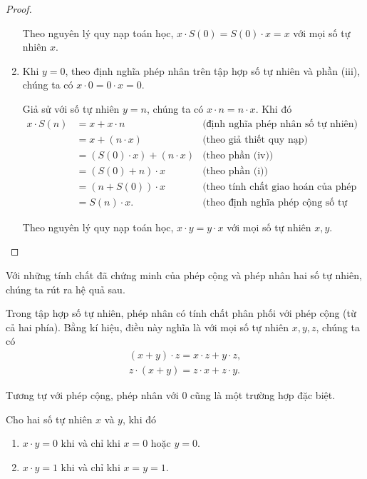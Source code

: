 \begin{proof}
\begin{enumerate}[label={(\roman*)}]
              Theo nguyên lý quy nạp toán học, $x\cdot S(0) = S(0)\cdot x = x$ với mọi số tự nhiên $x$.
        \item Khi $y = 0$, theo định nghĩa phép nhân trên tập hợp số tự nhiên và phần (iii), chúng ta có $x\cdot 0 = 0\cdot x = 0$.

              Giả sử với số tự nhiên $y = n$, chúng ta có $x\cdot n = n\cdot x$. Khi đó
              \begin{align*}
                  x\cdot S(n) & = x + x\cdot n               & \text{(định nghĩa phép nhân số tự nhiên)}                   \\
                              & = x + (n\cdot x)             & \text{(theo giả thiết quy nạp)}                             \\
                              & = (S(0)\cdot x) + (n\cdot x) & \text{(theo phần (iv))}                                     \\
                              & = (S(0) + n)\cdot x          & \text{(theo phần (i))}                                      \\
                              & = (n + S(0))\cdot x          & \text{(theo tính chất giao hoán của phép cộng số tự nhiên)} \\
                              & = S(n)\cdot x.               & \text{(theo định nghĩa phép cộng số tự nhiên)}
              \end{align*}

              Theo nguyên lý quy nạp toán học, $x\cdot y = y\cdot x$ với mọi số tự nhiên $x, y$.
    \end{enumerate}
\end{proof}

Với những tính chất đã chứng minh của phép cộng và phép nhân hai số tự nhiên, chúng ta rút ra hệ quả sau.

\begin{corollary}
    Trong tập hợp số tự nhiên, phép nhân có tính chất phân phối với phép cộng (từ cả hai phía). Bằng kí hiệu, điều này nghĩa là với mọi số tự nhiên $x, y, z$, chúng ta có
    \[
        \begin{split}
            (x + y)\cdot z = x\cdot z + y\cdot z, \\
            z\cdot (x + y) = z\cdot x + z\cdot y.
        \end{split}
    \]
\end{corollary}

Tương tự với phép cộng, phép nhân với $0$ cũng là một trường hợp đặc biệt.
\begin{theorem}\label{theorem:zero-one-and-natural-numbers-multiplication}
    Cho hai số tự nhiên $x$ và $y$, khi đó
    \begin{enumerate}[label={(\roman*)}]
        \item $x\cdot y = 0$ khi và chỉ khi $x = 0$ hoặc $y = 0$.
        \item $x\cdot y = 1$ khi và chỉ khi $x = y = 1$.
    \end{enumerate}
\end{theorem}


